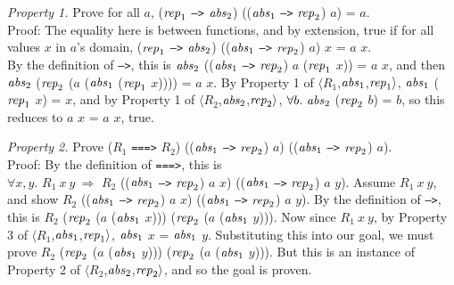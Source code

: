 \documentclass[envcountsame,runningheads]{llncs}
\begin{document}
{\it Property 1.} Prove for all $a$, 
(${\it rep}_1$ {\tt -->} ${\it abs}_2$)
((${\it abs}_1$ {\tt -->} ${\it rep}_2$) $a$) = $a$. \\
Proof:
The equality here is between functions, and by extension, true if
for all values $x$ in $a$'s domain,
(${\it rep}_1$ {\tt -->} ${\it abs}_2$)
((${\it abs}_1$ {\tt -->} ${\it rep}_2$) $a$) $x$ = $a$ $x$. \\
By the definition of {\tt -->}, this is
${\it abs}_2$
((${\it abs}_1$ {\tt -->} ${\it rep}_2$) $a$ (${\it rep}_1$ $x$)) = $a$ $x$,
and then
${\it abs}_2$ (${\it rep}_2$ ($a$ (${\it abs}_1$ (${\it rep}_1$ $x$)))) = $a$ $x$. 
By Property 1 of $\langle R_1$,${\it abs}_1$,${\it rep}_1 \rangle$, 
${\it abs}_1$ (${\it rep}_1$ $x$) = $x$, and
by Property 1 of $\langle R_2$,${\it abs}_2$,${\it rep}_2 \rangle$, 
$\forall b.\ {\it abs}_2$ (${\it rep}_2$ $b$) = $b$, so
this reduces to $a$ $x$ = $a$ $x$, true. 

{\it Property 2.} Prove
($R_1$ {\tt ===>} $R_2$)
((${\it abs}_1$ {\tt -->} ${\it rep}_2$) $a$)
((${\it abs}_1$ {\tt -->} ${\it rep}_2$) $a$). \\
Proof:
By the definition of {\tt ===>}, this is \\
$\forall x, y.$
$R_1 \ x \ y \ \Rightarrow$ $R_2$
((${\it abs}_1$ {\tt -->} ${\it rep}_2$) $a$ $x$)
((${\it abs}_1$ {\tt -->} ${\it rep}_2$) $a$ $y$). 
Assume $R_1 \ x \ y$, and show $R_2$
((${\it abs}_1$ {\tt -->} ${\it rep}_2$) $a$ $x$)
((${\it abs}_1$ {\tt -->} ${\it rep}_2$) $a$ $y$).
By the definition of {\tt -->}, this is $R_2$
(${\it rep}_2$ ($a$ (${\it abs}_1$ $x$)))
(${\it rep}_2$ ($a$ (${\it abs}_1$ $y$))).
Now since $R_1 \ x \ y$, by Property 3 of $\langle R_1$,${\it abs}_1$,${\it rep}_1 \rangle$,
${\it abs}_1$ $x$ = ${\it abs}_1$ $y$.
Substituting this into our goal, we must prove $R_2$
(${\it rep}_2$ ($a$ (${\it abs}_1$ $y$)))
(${\it rep}_2$ ($a$ (${\it abs}_1$ $y$))).
But this is an instance of Property 2 of
$\langle R_2$,${\it abs}_2$,${\it rep}_2 \rangle$, and
so the goal is proven.
\end{document}
